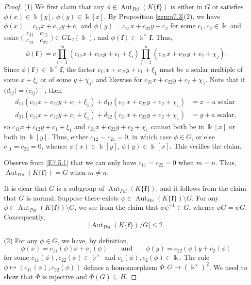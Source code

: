 \documentclass[12pt]{amsart}
\theoremstyle{plain}
\numberwithin{theorem}{section}
\numberwithin{equation}{theorem}
\theoremstyle{definition}
\DeclareMathOperator{\Aut}{Aut}
\newcommand \bff {{\mathbf{f}}}
\newcommand \kx {\Bbbk^\times}
\begin{document}
\begin{proof}
(1) We first claim that any $\phi \in \Aut_{Poi}(K\{\bff\})$ is either in $G$ or satisfies $\phi(x) \in \Bbbk[y]$, $\phi(y) \in \Bbbk[x]$.  By Proposition \ref{zzpro7.3}(2), we have $\phi(x) = c_{11}x+c_{12}y+c_1$ and $\phi(y) = c_{21}x+c_{22}y+c_2$ 
for some $c_1,c_2\in \Bbbk$ and some $\bigl( \begin{smallmatrix} c_{11}&c_{12}\\
c_{21}&c_{22}\end{smallmatrix} \bigr) \in GL_2(\Bbbk)$, and $\phi(\bff) \in \kx \bff$.  Thus,
\begin{equation}  \label{E7.5.1}  \tag{E7.5.1}
\phi(\bff) = c \prod_{i=1}^m (c_{11}x+c_{12}y+c_1 +\xi_i) \prod_{j=1}^n (c_{21}x+c_{22}y+c_2 + \chi_j).
\end{equation}
Since $\phi(\bff) \in \kx \bff$, the factor $c_{11}x+c_{12}y+c_1 +\xi_1$ must be a scalar multiple of some $x+\xi_i$ or of some $y+\chi_j$, and likewise for $c_{21}x+c_{22}y+c_2 + \chi_1$.  Note that if $\bigl( d_{ij} \bigr) = \bigl( c_{ij} \bigr)^{-1}$, then
\begin{align*}
d_{11}(c_{11}x+c_{12}y+c_1 +\xi_1) + d_{12}(c_{21}x+c_{22}y+c_2 + \chi_1) &= x + \text{a scalar}  \\
d_{21}(c_{11}x+c_{12}y+c_1 +\xi_1) + d_{22}(c_{21}x+c_{22}y+c_2 + \chi_1) &= y + \text{a scalar},
\end{align*}
so $c_{11}x+c_{12}y+c_1 +\xi_1$ and $c_{21}x+c_{22}y+c_2 + \chi_1$ cannot both be in $\Bbbk[x]$ or both in $\Bbbk[y]$.  Thus, either $c_{12} = c_{21} = 0$, in which case $\phi \in G$, or else $c_{11} = c_{22} = 0$, whence $\phi(x) \in \Bbbk[y]$, $\phi(y) \in \Bbbk[x]$.  This verifies the claim.

Observe from \eqref{E7.5.1} that we can only have $c_{11} = c_{22} = 0$ when $m=n$.  Thus, $\Aut_{Poi}(K\{\bff\}) = G$ when $m \ne n$.

It is clear that $G$ is a subgroup of $\Aut_{Poi}(K\{\bff\})$, and it follows from the claim that $G$ is normal.  Suppose there exists $\psi \in \Aut_{Poi}(K\{\bff\}) \setminus G$.  For any $\phi \in \Aut_{Poi}(K\{\bff\}) \setminus G$, we see from the claim that $\phi\psi^{-1} \in G$, whence $\phi G = \psi G$.  Consequently, 
$$
|{\Aut_{Poi}}(K\{\bff\}) / G | \le 2.
$$

(2) For any $\phi \in G$, we have, by definition,
$$
\phi(x) = c_{11}(\phi) x + c_1(\phi) \qquad \text{and} \qquad \phi(y) = c_{22}(\phi) y + c_2(\phi)
$$
for some $c_{11}(\phi), c_{22}(\phi) \in \kx$ and $c_1(\phi), c_2(\phi) \in \Bbbk$.  The rule $\phi \mapsto (c_{11}(\phi), c_{22}(\phi))$ defines a homomorphism $\Phi : G \rightarrow (\kx)^2$.  We need to show that $\Phi$ is injective and $\Phi(G) \subseteq H$.


\end{proof}
\end{document}
